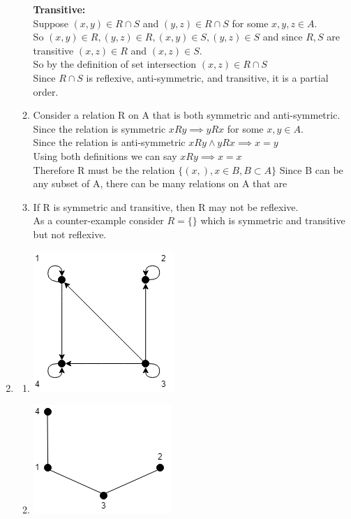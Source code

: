 \documentclass[11pt]{article}
\begin{document}
\begin{enumerate}[]
\begin{enumerate}[label=\alph*]
	\textbf{Transitive:}\\
	Suppose $(x,y)\in R\cap S$ and $(y,z)\in R\cap S$ for some $x,y,z\in A$.\\
	So $(x,y)\in R, (y,z)\in R, (x,y)\in S, (y,z)\in S$ and since $R,S$ are transitive $(x,z)\in R$ and $(x,z)\in S$.\\
	So by the definition of set intersection $(x,z)\in R\cap S$\\
	Since $R\cap S$ is 	reflexive, anti-symmetric, and transitive, it is a partial order.
	\item
	Consider a relation R on A that is both symmetric and anti-symmetric.\\
	Since the relation is symmetric $xRy \implies yRx$ for some $x,y\in A$.\\
	Since the relation is anti-symmetric $xRy \land yRx \implies x=y$\\
	Using both definitions we can say $xRy\implies x=x$\\
	Therefore R must be the relation $\{(x,), x \in B, B\subset A\}$
	Since B can be any subset of A, there can be many relations on A that are 
	\item
	If R is symmetric and transitive, then R may not be reflexive.\\
	As a counter-example consider $R=\{\}$ which is symmetric and transitive but not reflexive.
	\end{enumerate}
\item
	\begin{enumerate}[label=\alph*]
	\item \mbox{}
	\begin{center}
		\includegraphics[scale=0.5]{7a-digraph.png}\\
	\end{center}
	\item \mbox{}
	\begin{center}
		\includegraphics[scale=0.5]{7b-hasse-diagram.png}\\

\end{center}
\end{enumerate}
\end{enumerate}
\end{document}
